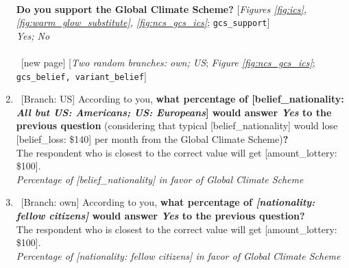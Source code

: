 \begin{enumerate}[resume]
~\\\textbf{
Do you support the Global Climate Scheme?
} [\textit{Figures \ref{fig:ics}, \ref{fig:warm_glow_substitute}, \ref{fig:ncs_gcs_ics}}; 
\verb|gcs_support|]
  \\ \textit{Yes; No}\\\\
~[new page] [\textit{Two random branches: own; US}; \textit{Figure \ref{fig:ncs_gcs_ics}}; \verb|gcs_belief, variant_belief|] 
\item ~[Branch: US] \label{q:gcs_belief_us} According to you, \textbf{what percentage of [belief\_nationality: \textit{All but US: Americans; US: Europeans}] would answer \textit{Yes }to the previous question} (considering that typical [belief\_nationality] would lose [belief\_loss: \$140] per month from the Global Climate Scheme)\textbf{?}\\ The respondent who is closest to the correct value will get [amount\_lottery: \$100]. %
  \\ \textit{Percentage of [belief\_nationality] in favor of Global Climate Scheme}

\item ~[Branch: own] \label{q:gcs_belief_own} According to you, \textbf{what percentage of \textit{[nationality: fellow citizens]} would answer \textit{Yes }to the previous question?}\\ The respondent who is closest to the correct value will get [amount\_lottery: \$100]. %
  \\ \textit{Percentage of [nationality: fellow citizens] in favor of Global Climate Scheme}

\end{enumerate} 

